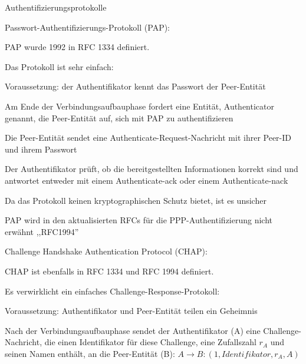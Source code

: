 \documentclass[a4paper]{article}
\begin{document}
\begin{multicols}{3}
      Authentifizierungsprotokolle
      \begin{itemize*}
            \item Passwort-Authentifizierungs-Protokoll (PAP):
            \begin{itemize*}
                  \item PAP wurde 1992 in RFC 1334 definiert.
                  \item Das Protokoll ist sehr einfach:
                  \begin{itemize*}
                        \item Voraussetzung: der Authentifikator kennt das Passwort der Peer-Entität
                        \item Am Ende der Verbindungsaufbauphase fordert eine Entität, Authenticator genannt, die Peer-Entität auf, sich mit PAP zu authentifizieren
                        \item Die Peer-Entität sendet eine Authenticate-Request-Nachricht mit ihrer Peer-ID und ihrem Passwort
                        \item Der Authentifikator prüft, ob die bereitgestellten Informationen korrekt sind und antwortet entweder mit einem Authenticate-ack oder einem Authenticate-nack
                  \end{itemize*}
                  \item Da das Protokoll keinen kryptographischen Schutz bietet, ist es unsicher
                  \item PAP wird in den aktualisierten RFCs für die PPP-Authentifizierung nicht erwähnt ,,RFC1994''
            \end{itemize*}
            \item Challenge Handshake Authentication Protocol (CHAP):
            \begin{itemize*}
                  \item CHAP ist ebenfalls in RFC 1334 und RFC 1994 definiert.
                  \item Es verwirklicht ein einfaches Challenge-Response-Protokoll:
                  \begin{itemize*}
                        \item Voraussetzung: Authentifikator und Peer-Entität teilen ein Geheimnis
                        \item Nach der Verbindungsaufbauphase sendet der Authentifikator (A) eine Challenge-Nachricht, die einen Identifikator für diese Challenge, eine Zufallszahl $r_A$ und seinen Namen enthält, an die Peer-Entität (B): $A \rightarrow B: (1, Identifikator, r_A, A)$

\end{itemize*}
\end{itemize*}
\end{itemize*}
\end{multicols}
\end{document}
